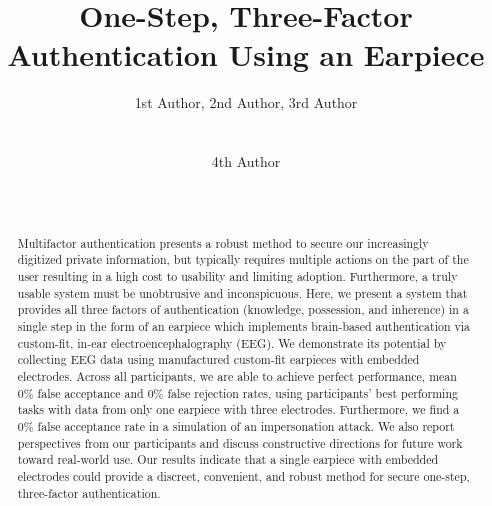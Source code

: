 \documentclass{sigchi}
\begin{document}
\title{One-Step, Three-Factor Authentication Using an Earpiece}

\author{
  \alignauthor 1st Author, 2nd Author, 3rd Author\\
    \\
    \\
  \alignauthor 4th Author\\
    \\
    \\
}

\maketitle

\begin{abstract}
 Multifactor authentication presents a robust method to secure our increasingly digitized private information, but typically requires multiple actions on the part of the user resulting in a high cost to usability and limiting adoption. Furthermore, a truly usable system must be unobtrusive and inconspicuous. Here, we present a system that provides all three factors of authentication (knowledge, possession, and inherence) in a single step in the form of an earpiece which implements brain-based authentication via custom-fit, in-ear electroencephalography (EEG). We demonstrate its potential by collecting EEG data using manufactured custom-fit earpieces with embedded electrodes. Across all participants, we are able to achieve perfect performance, mean 0\% false acceptance and 0\% false rejection rates, using participants' best performing tasks with data from only one earpiece with three electrodes. Furthermore, we find a 0\% false acceptance rate in a simulation of an impersonation attack. We also report perspectives from our participants and discuss constructive directions for future work toward real-world use. Our results indicate that a single earpiece with embedded electrodes could provide a discreet, convenient, and robust method for secure one-step, three-factor authentication.
\end{abstract}



\end{document}

